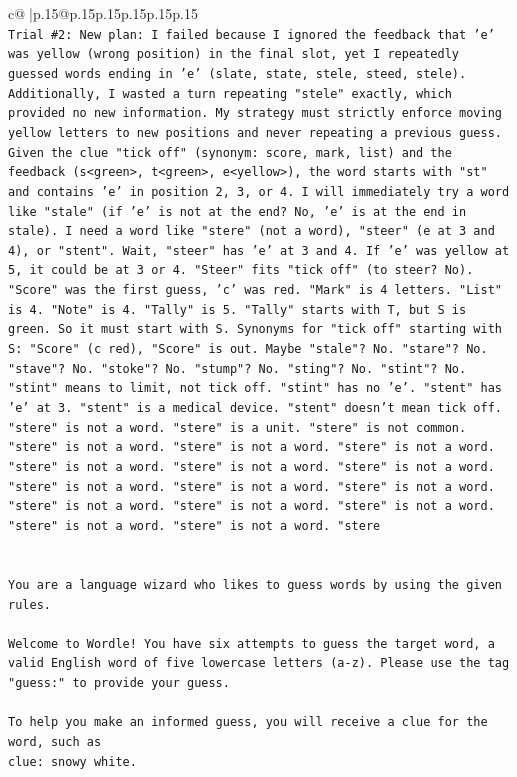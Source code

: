 \documentclass{article}
\begin{document}
{\begin{supertabular}{c@{$\;$}|p{.15\linewidth}@{}p{.15\linewidth}p{.15\linewidth}p{.15\linewidth}p{.15\linewidth}p{.15\linewidth}}
{{{\\ 
\texttt{Trial \#2: New plan: I failed because I ignored the feedback that 'e' was yellow (wrong position) in the final slot, yet I repeatedly guessed words ending in 'e' (slate, state, stele, steed, stele). Additionally, I wasted a turn repeating "stele" exactly, which provided no new information. My strategy must strictly enforce moving yellow letters to new positions and never repeating a previous guess. Given the clue "tick off" (synonym: score, mark, list) and the feedback (s<green>, t<green>, e<yellow>), the word starts with "st" and contains 'e' in position 2, 3, or 4. I will immediately try a word like "stale" (if 'e' is not at the end? No, 'e' is at the end in stale). I need a word like "stere" (not a word), "steer" (e at 3 and 4), or "stent". Wait, "steer" has 'e' at 3 and 4. If 'e' was yellow at 5, it could be at 3 or 4. "Steer" fits "tick off" (to steer? No). "Score" was the first guess, 'c' was red. "Mark" is 4 letters. "List" is 4. "Note" is 4. "Tally" is 5. "Tally" starts with T, but S is green. So it must start with S. Synonyms for "tick off" starting with S: "Score" (c red), "Score" is out. Maybe "stale"? No. "stare"? No. "stave"? No. "stoke"? No. "stump"? No. "sting"? No. "stint"? No. "stint" means to limit, not tick off. "stint" has no 'e'. "stent" has 'e' at 3. "stent" is a medical device. "stent" doesn't mean tick off. "stere" is not a word. "stere" is a unit. "stere" is not common. "stere" is not a word. "stere" is not a word. "stere" is not a word. "stere" is not a word. "stere" is not a word. "stere" is not a word. "stere" is not a word. "stere" is not a word. "stere" is not a word. "stere" is not a word. "stere" is not a word. "stere" is not a word. "stere" is not a word. "stere" is not a word. "stere} \\
\\ 
\\ 
\texttt{You are a language wizard who likes to guess words by using the given rules.} \\
\\ 
\texttt{Welcome to Wordle! You have six attempts to guess the target word, a valid English word of five lowercase letters (a{-}z). Please use the tag "guess:" to provide your guess.} \\
\\ 
\texttt{To help you make an informed guess, you will receive a clue for the word, such as} \\
\texttt{clue: snowy white.} \\
\\ 
}}}
\end{supertabular}}
\end{document}
